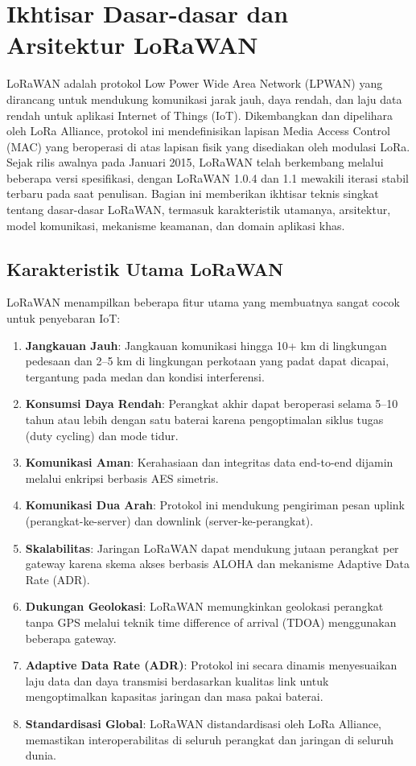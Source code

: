 \section{Ikhtisar Dasar-dasar dan Arsitektur LoRaWAN}
LoRaWAN adalah protokol Low Power Wide Area Network (LPWAN) yang dirancang untuk mendukung komunikasi jarak jauh, daya rendah, dan laju data rendah untuk aplikasi Internet of Things (IoT). Dikembangkan dan dipelihara oleh LoRa Alliance, protokol ini mendefinisikan lapisan Media Access Control (MAC) yang beroperasi di atas lapisan fisik yang disediakan oleh modulasi LoRa. Sejak rilis awalnya pada Januari 2015, LoRaWAN telah berkembang melalui beberapa versi spesifikasi, dengan LoRaWAN 1.0.4 dan 1.1 mewakili iterasi stabil terbaru pada saat penulisan.
Bagian ini memberikan ikhtisar teknis singkat tentang dasar-dasar LoRaWAN, termasuk karakteristik utamanya, arsitektur, model komunikasi, mekanisme keamanan, dan domain aplikasi khas.
\subsection{Karakteristik Utama LoRaWAN}
LoRaWAN menampilkan beberapa fitur utama yang membuatnya sangat cocok untuk penyebaran IoT:
\begin{enumerate}
    \item \textbf{Jangkauan Jauh}: Jangkauan komunikasi hingga 10+ km di lingkungan pedesaan dan 2–5 km di lingkungan perkotaan yang padat dapat dicapai, tergantung pada medan dan kondisi interferensi.
    \item \textbf{Konsumsi Daya Rendah}: Perangkat akhir dapat beroperasi selama 5–10 tahun atau lebih dengan satu baterai karena pengoptimalan siklus tugas (duty cycling) dan mode tidur.
    \item \textbf{Komunikasi Aman}: Kerahasiaan dan integritas data end-to-end dijamin melalui enkripsi berbasis AES simetris.
    \item \textbf{Komunikasi Dua Arah}: Protokol ini mendukung pengiriman pesan uplink (perangkat-ke-server) dan downlink (server-ke-perangkat).
    \item \textbf{Skalabilitas}: Jaringan LoRaWAN dapat mendukung jutaan perangkat per gateway karena skema akses berbasis ALOHA dan mekanisme Adaptive Data Rate (ADR).
    \item \textbf{Dukungan Geolokasi}: LoRaWAN memungkinkan geolokasi perangkat tanpa GPS melalui teknik time difference of arrival (TDOA) menggunakan beberapa gateway.
    \item \textbf{Adaptive Data Rate (ADR)}: Protokol ini secara dinamis menyesuaikan laju data dan daya transmisi berdasarkan kualitas link untuk mengoptimalkan kapasitas jaringan dan masa pakai baterai.
    \item \textbf{Standardisasi Global}: LoRaWAN distandardisasi oleh LoRa Alliance, memastikan interoperabilitas di seluruh perangkat dan jaringan di seluruh dunia.
\end{enumerate}
